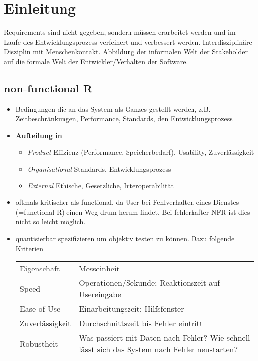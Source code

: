 \section{Einleitung}
Requirements sind nicht gegeben, sondern müssen erarbeitet werden und im Laufe des Entwicklungsprozess verfeinert und verbessert werden.
Interdisziplinäre Disziplin mit Menschenkontakt. Abbildung der informalen Welt der Stakeholder auf die formale Welt der Entwickler/Verhalten der Software.

\subsection{non-functional R}
\begin{itemize}
	\item Bedingungen die an das System als Ganzes gestellt werden, z.B. Zeitbeschränkungen, Performance, Standards, den Entwicklungsprozess
	\item \textbf{Aufteilung in}
	\begin{itemize}
		\item \textit{Product} Effizienz (Performance, Speicherbedarf), Usability, Zuverlässigkeit
		\item \textit{Organisational} Standards, Entwicklungsprozess
		\item \textit{External} Ethische, Gesetzliche, Interoperabilität
	\end{itemize}
	\item oftmals kritischer als functional, da User bei Fehlverhalten eines Dienstes (=functional R) einen Weg drum herum findet. Bei fehlerhafter NFR ist dies nicht so leicht möglich.
	\item quantisierbar spezifizieren um objektiv testen zu können. Dazu folgende Kriterien
	\begin{table}[!h]
		\begin{tabular}{ll}
			Eigenschaft	& Messeinheit\\
			Speed		& Operationen/Sekunde; Reaktionszeit auf Usereingabe\\
			Ease of Use	& Einarbeitungszeit; Hilfsfenster\\
			Zuverlässigkeit & Durchschnittszeit bis Fehler eintritt\\
			Robustheit & Was passiert mit Daten nach Fehler? Wie schnell lässt sich das System nach Fehler neustarten?
		\end{tabular}
	\end{table}
	
\end{itemize}

